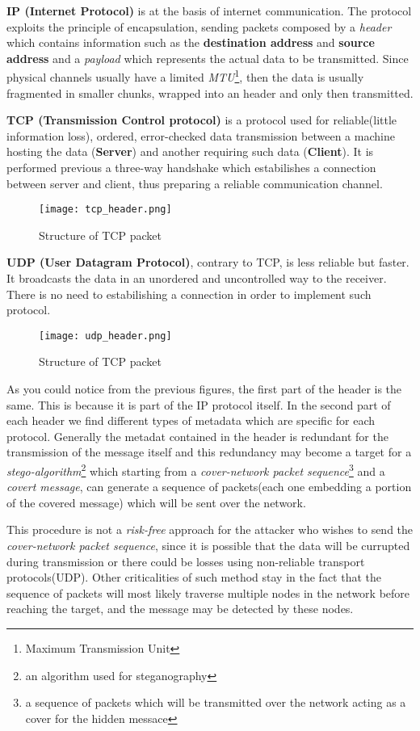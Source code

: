 \documentclass[../../main.tex]{subfiles}
\begin{document}
    \textbf{IP (Internet Protocol)} is at the basis of internet communication. The protocol exploits the principle of encapsulation, sending packets composed by a \emph{header} which contains information such as the \textbf{destination address} and \textbf{source address} and a \emph{payload}
    which represents the actual data to be transmitted. Since physical channels usually have a limited \emph{MTU}\footnote{Maximum Transmission Unit}, then the data is usually fragmented in smaller chunks, wrapped into an header and only then transmitted.
    
    \textbf{TCP (Transmission Control protocol)} is a protocol used for reliable(little information loss), ordered, error-checked data transmission between a machine
    hosting the data (\textbf{Server}) and another requiring such data (\textbf{Client}). It is performed previous a three-way handshake which estabilishes a connection between server and client, thus preparing 
    a reliable communication channel.
    \begin{figure}[h]
        \centering
        \caption{Structure of TCP packet}
        \texttt{[image: tcp\_header.png]}
    \end{figure}
    \pagebreak

    \textbf{UDP (User Datagram Protocol)}, contrary to TCP, is less reliable but faster.
     It broadcasts the data in an unordered and uncontrolled way to the receiver. 
    There is no need to estabilishing a connection in order to implement such protocol.

    \begin{figure}[h]
        \centering
        \caption{Structure of TCP packet}
        \texttt{[image: udp\_header.png]}
    \end{figure}

    As you could notice from the previous figures, the first part of the header is the same. This is because it is part of the IP protocol itself.
    In the second part of each header we find different types of metadata which are specific for each protocol. Generally the metadat contained in the header is redundant 
    for the transmission of the message itself and this redundancy may become a target for a \emph{stego-algorithm}\footnote{an algorithm used for steganography} which starting from a 
    \emph{cover-network packet sequence}\footnote{a sequence of packets which will be transmitted over the network acting as a cover for the hidden messace} and a \emph{covert message}, can generate a sequence of packets(each one embedding a portion of the covered message) which will be sent over the network.

    This procedure is not a \emph{risk-free} approach for the attacker who wishes to send the \emph{cover-network packet sequence}, since it is possible that the data will be currupted during transmission or there could be losses using non-reliable transport protocols(UDP).
    Other criticalities of such method stay in the fact that the sequence of packets will most likely traverse multiple nodes in the network before reaching the target, and the message may be detected by these nodes.

    


    \pagebreak
\end{document}
